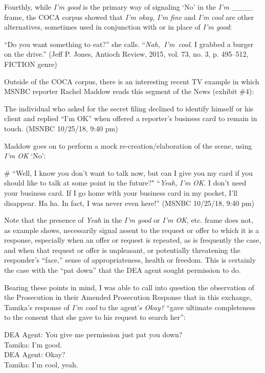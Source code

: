 \documentclass[output=paper,colorlinks,citecolor=brown]{langscibook}
\begin{document}
Fourthly, while \textit{I'm good} is the primary way of signaling `No' in the  \textit{I'm \_\_\_\_} frame, the COCA corpus showed that \textit{I'm okay}, \textit{I'm fine} and \textit{I'm cool} are other alternatives, sometimes used in conjunction with or in place of \textit{I'm good}:

\ea%
    \label{ex:rickford:12}
   “Do you want something to eat?” she calls. “\textit{Nah,~I'm~cool}. I grabbed a burger on the drive.” (Jeff P. Jones, Antioch Review, 2015, vol. 73, no. 3, p. 495--512, FICTION genre)
\z

Outside of the COCA corpus, there is an interesting recent TV example in which MSNBC reporter Rachel Maddow reads this segment of the News (exhibit \#4):

\ea%
	\label{ex:rickford:13}
The individual who asked for the secret filing declined to identify himself or his client and replied “I'm OK” when offered a reporter's business card to remain in touch. (MSNBC 10/25/18, 9:40 pm)
\z

Maddow goes on to perform a mock re-creation\slash elaboration of the scene, using \textit{I'm OK} `No':  

\ea%
    \label{ex:rickford:14}
 \# “Well, I know you don't want to talk now, but can I give you my card if you should like to talk at some point in the future?" “\textit{Yeah,} \textit{I'm} \textit{OK}.  I don't need your business card.  If I go home with your business card in my pocket, I'll disappear.  Ha ha.  In fact, I was never even here!” (MSNBC 10/25/18, 9:40 pm)
\z

   
Note that the presence of \textit{Yeah}  in the \textit{I'm good}  or \textit{I'm OK}, etc. frame does not, as example  shows, necessarily signal assent to the request or offer to which it is a response, especially when an offer or request is repeated, as is frequently the case, and when that  request or offer is unpleasant, or potentially threatening the responder's “face,” sense of appropriateness, health or freedom.  This is certainly the case with the “pat down” that the DEA agent sought permission to do.

Bearing these points in mind, I was able to call into question the observation of the Prosecution in their Amended Prosecution Response that in this exchange, Tamika's response of \textit{I'm cool} to the agent's \textit{Okay?} “gave ultimate completeness to the consent that she gave to his request to search her”:

 
\ea%
\label{ex:rickford:15}
DEA Agent: You give me permission just pat you down? \\
Tamika: I’m good. \\
DEA Agent: Okay?\\
Tamika: I'm cool, yeah.
\z
\end{document}
